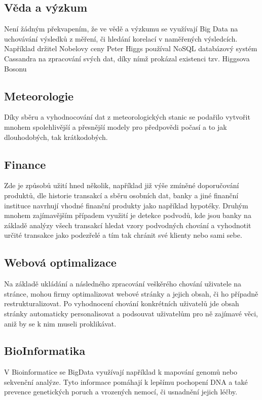 \subsection{Věda a výzkum}

Není žádným překvapením, že ve vědě a výzkumu se využívají Big Data na uchovávání výsledků z měření, či hledání korelací v naměřených výsledcích. Například držitel Nobelovy ceny Peter Higgs používal NoSQL databázový systém Cassandra na zpracování svých dat, díky nímž prokázal existenci tzv. Higgsova Bosonu \cite{higgs}

\subsection{Meteorologie}
Díky sběru a vyhodnocování dat z meteorologických stanic se podařilo vytvořit mnohem spolehlivější a přesnější modely pro předpovědi počasí a to jak dlouhodobých, tak krátkodobých. 

\subsection{Finance}
Zde je způsobů užití hned několik, například již výše zmíněné doporučování produktů, dle historie transakcí a sběru  osobních dat, banky a jiné finanční instituce navrhují vhodné finanční produkty jako například hypotéky. Druhým mnohem zajímavějším případem využití je detekce podvodů, kde jsou banky na základě analýzy všech transakcí hledat vzory podvodných chování a vyhodnotit určité transakce jako podezřelé a tím tak chránit své klienty nebo sami sebe.

\subsection{Webová optimalizace}
Na základě ukládání a následného zpracování veškěrého chování uživatele na stránce, mohou firmy optimalizovat webové stránky a jejich obsah, či ho případně restrukturalizovat. Po vyhodnocení chování konkrétních uživatelů jde obsah stránky automaticky personalisovat a podsouvat uživatelům pro ně zajímavé věci, aniž by se k nim museli proklikávat.

\subsection{BioInformatika}
V Bioinformatice se BigData využívají například k mapování genomů nebo sekvenční analýze. Tyto informace pomáhají k lepšímu pochopení DNA a také prevence genetických poruch a vrozených nemocí, či usnadnění jejich léčby. \cite{industries} 

